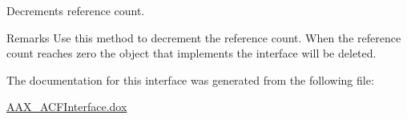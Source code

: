 Decrements reference count. 

\begin{DoxyRemark}{Remarks}
Use this method to decrement the reference count. When the reference count reaches zero the object that implements the interface will be deleted. 
\end{DoxyRemark}


The documentation for this interface was generated from the following file\+:\begin{DoxyCompactItemize}
\item 
\mbox{\hyperlink{a00269}{A\+A\+X\+\_\+\+A\+C\+F\+Interface.\+dox}}\end{DoxyCompactItemize}
